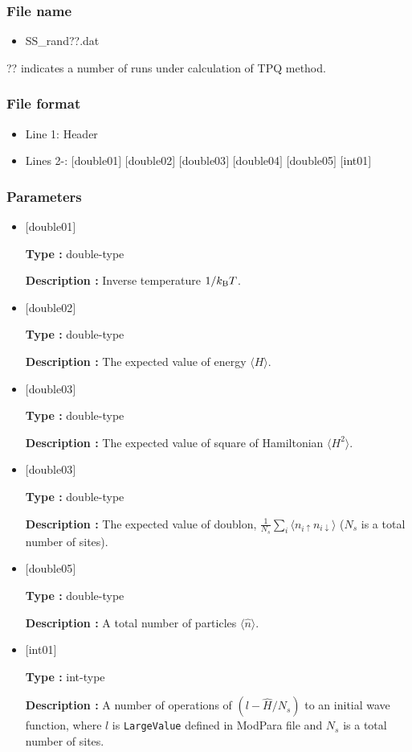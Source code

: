 \subsubsection{File name}
 \begin{itemize}
   \item SS\_rand??.dat
  \end{itemize}
  ?? indicates a number of runs under calculation of TPQ method.

\subsubsection{File format}
\begin{itemize}
   \item Line 1: Header
   \item Lines 2-: $[$double01$]$ $[$double02$]$ $[$double03$]$ $[$double04$]$ $[$double05$]$ $[$int01$]$
  \end{itemize}
\subsubsection{Parameters}
 \begin{itemize}

  \item  $[$double01$]$
  
 {\bf Type :} double-type

{\bf Description :} Inverse temperature $1/{k_{\rm B}T}$.
 
  \item $[$double02$]$

 {\bf Type :} double-type 

{\bf Description :}  The expected value of  energy $\langle H \rangle$.

  \item $[$double03$]$

 {\bf Type :} double-type 

{\bf Description :} The expected value of square of Hamiltonian $\langle H^2 \rangle$. 

  \item $[$double03$]$

 {\bf Type :} double-type 

{\bf Description :} The expected value of doublon, 
$\frac{1}{N_s} \sum_{i}\langle n_{i\uparrow}n_{i\downarrow}\rangle$ ($N_{s}$ is a total number of sites).

  \item $[$double05$]$

 {\bf Type :} double-type 

{\bf Description :} A total number of particles $\langle {\hat n} \rangle$.


  \item $[$int01$]$

 {\bf Type :} int-type 

{\bf Description :} A number of operations of $(l-\hat{H}/N_{s})$ to an initial wave function, where $l$ is \verb|LargeValue| defined in ModPara file and $N_{s}$ is a total number of sites.

 \end{itemize}

